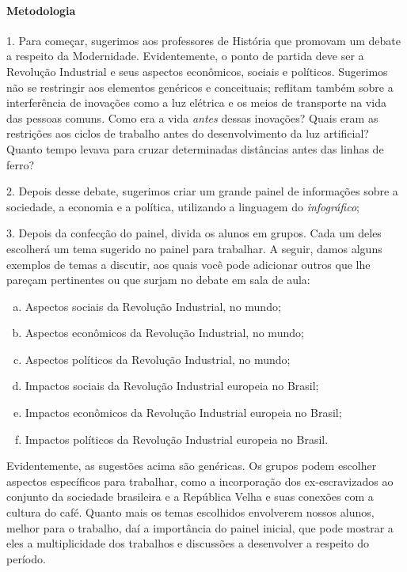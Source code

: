 \documentclass[11pt]{extarticle}
\begin{document}
\paragraph{Metodologia}

1. Para começar, sugerimos aos professores de História que promovam um
debate a respeito da Modernidade. Evidentemente, o ponto de partida deve
ser a Revolução Industrial e seus aspectos econômicos, sociais e
políticos. Sugerimos não se restringir aos elementos genéricos e
conceituais; reflitam também sobre a interferência de inovações como a
luz elétrica e os meios de transporte na vida das pessoas comuns. Como
era a vida \emph{antes} dessas inovações? Quais eram as restrições aos
ciclos de trabalho antes do desenvolvimento da luz artificial? Quanto
tempo levava para cruzar determinadas distâncias antes das linhas de
ferro?

2. Depois desse debate, sugerimos criar um grande painel de informações
sobre a sociedade, a economia e a política, utilizando a linguagem do
\emph{infográfico};



3. Depois da confecção do painel, divida os alunos em grupos. Cada um
deles escolherá um tema sugerido no painel para trabalhar. A seguir,
damos alguns exemplos de temas a discutir, aos quais você pode adicionar
outros que lhe pareçam pertinentes ou que surjam no debate em sala de
aula:

\begin{enumerate}[(a)]  

\item Aspectos sociais da Revolução Industrial, no mundo;

\item Aspectos econômicos da Revolução Industrial, no mundo;

\item Aspectos políticos da Revolução Industrial, no mundo;

\item Impactos sociais da Revolução Industrial europeia no Brasil;

\item Impactos econômicos da Revolução Industrial europeia no Brasil;

\item Impactos políticos da Revolução Industrial europeia no Brasil.

\end{enumerate} 


Evidentemente, as sugestões acima são genéricas. Os grupos podem
escolher aspectos específicos para trabalhar, como a incorporação dos
ex-escravizados ao conjunto da sociedade brasileira e a República Velha
e suas conexões com a cultura do café. Quanto mais os temas escolhidos
envolverem nossos alunos, melhor para o trabalho, daí a importância do
painel inicial, que pode mostrar a eles a multiplicidade dos trabalhos e
discussões a desenvolver a respeito do período.
\end{document}
